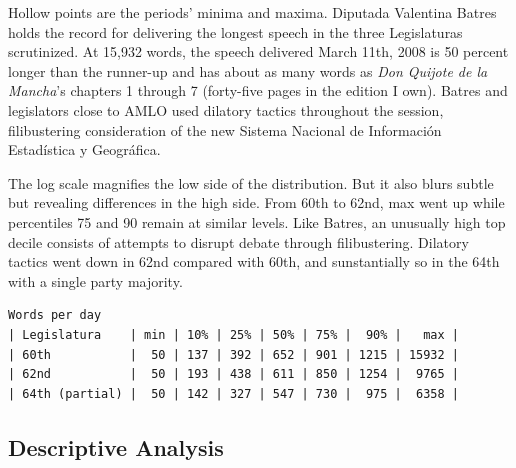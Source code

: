 \documentclass[letter,12pt]{article}
\begin{document}
Hollow points are the periods' minima and maxima. Diputada Valentina Batres holds the record for delivering the longest speech in the three Legislaturas scrutinized. At 15,932 words, the speech delivered March 11th, 2008 is 50 percent longer than the runner-up and has about as many words as \emph{Don Quijote de la Mancha}'s chapters 1 through 7 (forty-five pages in the edition I own). Batres and legislators close to AMLO used dilatory tactics throughout the session, filibustering consideration of the new Sistema Nacional de Información Estadística y Geográfica. 
  


The log scale magnifies the low side of the distribution. But it also blurs subtle but revealing differences in the high side. From 60th to 62nd, max went up while percentiles 75 and 90 remain at similar levels. Like Batres, an unusually high top decile consists of attempts to disrupt debate through filibustering. Dilatory tactics went down in 62nd compared with 60th, and sunstantially so in the 64th with a single party majority.

\singlespacing
\begin{footnotesize}
\begin{verbatim}
Words per day
| Legislatura    | min | 10% | 25% | 50% | 75% |  90% |   max |
| 60th           |  50 | 137 | 392 | 652 | 901 | 1215 | 15932 |
| 62nd           |  50 | 193 | 438 | 611 | 850 | 1254 |  9765 |
| 64th (partial) |  50 | 142 | 327 | 547 | 730 |  975 |  6358 |
\end{verbatim}
\end{footnotesize}
\doublespacing



  \subsection{Descriptive Analysis}
\end{document}
